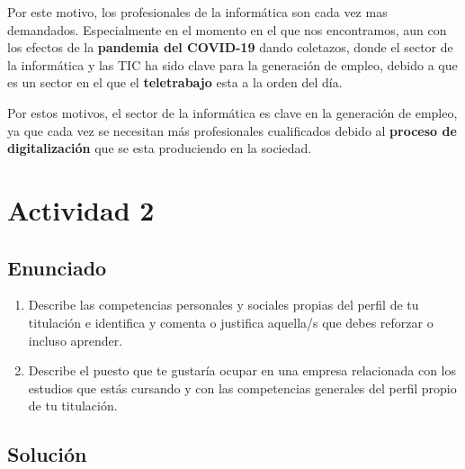 Por este motivo, los profesionales de la informática son cada vez mas demandados. Especialmente en el momento en el que nos encontramos, aun con los efectos de la  \textbf{pandemia del COVID-19} dando coletazos, donde el sector de la informática y las TIC ha sido clave para la generación de empleo, debido a que es un sector en el que el \textbf{teletrabajo} esta a la orden del día.

Por estos motivos, el sector de la informática es clave en la generación de empleo, ya que cada vez se necesitan más profesionales cualificados debido al \textbf{proceso de digitalización} que se esta produciendo en la sociedad.

\section{Actividad 2}
\subsection{Enunciado}
    \begin{enumerate}[label=(\alph*)]
    \item Describe las competencias personales y sociales propias del perfil de tu titulación e identifica y comenta o justifica aquella/s que debes reforzar o incluso aprender.
    \item Describe el  puesto que te gustaría ocupar en una empresa relacionada con los estudios que estás cursando y con las competencias generales del perfil propio de tu titulación.
\end{enumerate}

\subsection{Solución}

